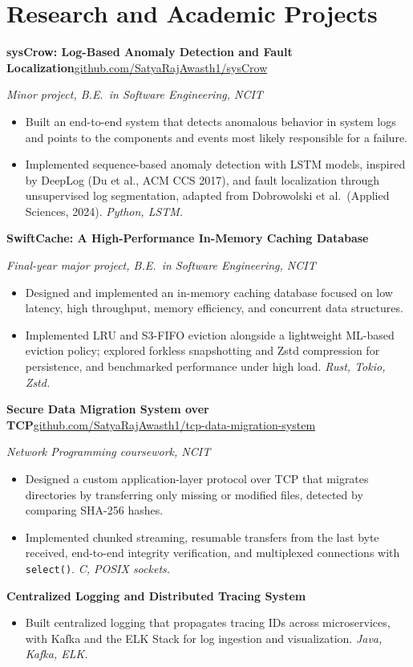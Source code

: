 \documentclass[11pt,letterpaper]{article}
\newcommand{\project}[3]{%
  \textbf{#1}\hfill{\color{muted}#3}\par
  {\itshape #2}\par
  \nopagebreak
}
\newcommand{\gap}{\vspace{0.45em}}
\begin{document}
\section{Research and Academic Projects}
\project{sysCrow: Log-Based Anomaly Detection and Fault Localization}
        {Minor project, B.E.\ in Software Engineering, NCIT}
        {\href{https://github.com/SatyaRajAwasth1/sysCrow}{github.com/SatyaRajAwasth1/sysCrow}}
\begin{itemize}
  \item Built an end-to-end system that detects anomalous behavior in system logs and points to the
        components and events most likely responsible for a failure.
  \item Implemented sequence-based anomaly detection with LSTM models, inspired by DeepLog (Du et al.,
        ACM CCS 2017), and fault localization through unsupervised log segmentation, adapted from
        Dobrowolski et al.\ (Applied Sciences, 2024). \textit{Python, LSTM.}
\end{itemize}
\gap
\project{SwiftCache: A High-Performance In-Memory Caching Database}
        {Final-year major project, B.E.\ in Software Engineering, NCIT}{}
\begin{itemize}
  \item Designed and implemented an in-memory caching database focused on low latency, high
        throughput, memory efficiency, and concurrent data structures.
  \item Implemented LRU and S3-FIFO eviction alongside a lightweight ML-based eviction policy; explored
        forkless snapshotting and Zstd compression for persistence, and benchmarked performance under
        high load. \textit{Rust, Tokio, Zstd.}
\end{itemize}
\gap
\project{Secure Data Migration System over TCP}
        {Network Programming coursework, NCIT}
        {\href{https://github.com/SatyaRajAwasth1/tcp-data-migration-system}{github.com/SatyaRajAwasth1/tcp-data-migration-system}}
\begin{itemize}
  \item Designed a custom application-layer protocol over TCP that migrates directories by transferring
        only missing or modified files, detected by comparing SHA-256 hashes.
  \item Implemented chunked streaming, resumable transfers from the last byte received, end-to-end
        integrity verification, and multiplexed connections with \texttt{select()}.
        \textit{C, POSIX sockets.}
\end{itemize}
\gap
\textbf{Centralized Logging and Distributed Tracing System}\par\nopagebreak
\begin{itemize}
  \item Built centralized logging that propagates tracing IDs across microservices, with Kafka and the
        ELK Stack for log ingestion and visualization. \textit{Java, Kafka, ELK.}
\end{itemize}
\end{document}

